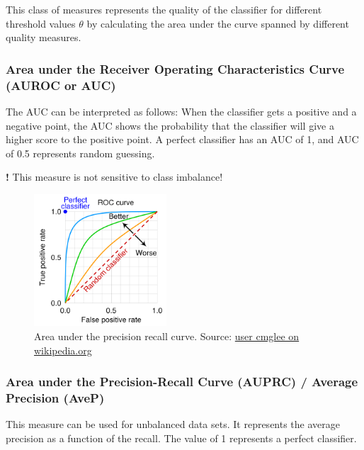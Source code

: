 \documentclass[
]{book}
\begin{document}
This class of measures represents the quality of the classifier for
different threshold values \(\theta\) by calculating the area under the
curve spanned by different quality measures.

\hypertarget{area-under-the-receiver-operating-characteristics-curve-auroc-or-auc}{%
\subsubsection{Area under the Receiver Operating Characteristics Curve (AUROC or AUC)}\label{area-under-the-receiver-operating-characteristics-curve-auroc-or-auc}}

The AUC can be interpreted as follows: When the classifier gets a
positive and a negative point, the AUC shows the probability that the
classifier will give a higher score to the positive point. A perfect
classifier has an AUC of 1, and AUC of 0.5 represents random guessing.

\textbf{!} This measure is not sensitive to class imbalance!

\begin{figure}
\centering
\includegraphics[width=0.44\textwidth,height=\textheight]{figures/Roc_curve.png}
\caption{Area under the precision recall curve. Source: \href{https://commons.wikimedia.org/wiki/File:Roc_curve.svg}{user cmglee on
wikipedia.org}}
\end{figure}

\hypertarget{area-under-the-precision-recall-curve-auprc-average-precision-avep}{%
\subsubsection{Area under the Precision-Recall Curve (AUPRC) / Average Precision (AveP)}\label{area-under-the-precision-recall-curve-auprc-average-precision-avep}}

This measure can be used for unbalanced data sets. It represents the
average precision as a function of the recall. The value of 1 represents
a perfect classifier.
\end{document}
